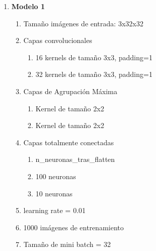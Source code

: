 \begin{enumerate}
	\item \textbf{Modelo 1}
	\begin{enumerate}[label=\textbullet, nosep]
		\item Tamaño imágenes de entrada: 3x32x32
		\item Capas convolucionales
			\begin{enumerate}[label=\textbullet, nosep]
				\item 16 kernels de tamaño 3x3, padding=1
				\item 32 kernels de tamaño 3x3, padding=1
			\end{enumerate}
		\item Capas de Agrupación Máxima
		\begin{enumerate}[label=\textbullet, nosep]
			\item Kernel de tamaño 2x2
			\item Kernel de tamaño 2x2
		\end{enumerate}
		\item Capas totalmente conectadas
		\begin{enumerate}[label=\textbullet, nosep]
			\item n\_neuronas\_tras\_flatten
			\item 100 neuronas
			\item 10 neuronas
		\end{enumerate}
		\item learning rate = 0.01
		\item 1000 imágenes de entrenamiento
		\item Tamaño de mini batch = 32
	\end{enumerate}
	

\end{enumerate}
